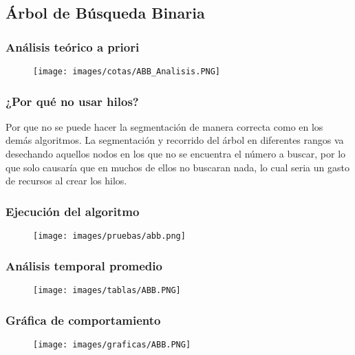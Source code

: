 \documentclass[12pt]{article}
\begin{document}

		\subsection{Árbol de Búsqueda Binaria}
			
			\subsubsection{Análisis teórico a priori}
				\begin{figure}[H]
			    	   \centering
			    	   \texttt{[image: images/cotas/ABB\_Analisis.PNG]}
			    \end{figure}
			
			\subsubsection{¿Por qué no usar hilos?}
			    Por que no se puede hacer la segmentación de manera correcta como en los demás algoritmos. La segmentación y recorrido del árbol en diferentes rangos va desechando aquellos nodos en los que no se encuentra el número a buscar, por lo que solo causaría que en muchos de ellos no buscaran nada, lo cual seria un gasto de recursos al crear los hilos.
			
			\subsubsection{Ejecución del algoritmo}
				\begin{figure}[H]
			    	   \centering
			    	   \texttt{[image: images/pruebas/abb.png]}
			    \end{figure}

			\subsubsection{Análisis temporal promedio}
				\begin{figure}[H]
			    	   \centering
			    	   \texttt{[image: images/tablas/ABB.PNG]}
			    \end{figure}
			
			\subsubsection{Gráfica de comportamiento}
				\begin{figure}[H]
			    	   \centering
			    	   \texttt{[image: images/graficas/ABB.PNG]}
			    \end{figure}
			
\end{document}
